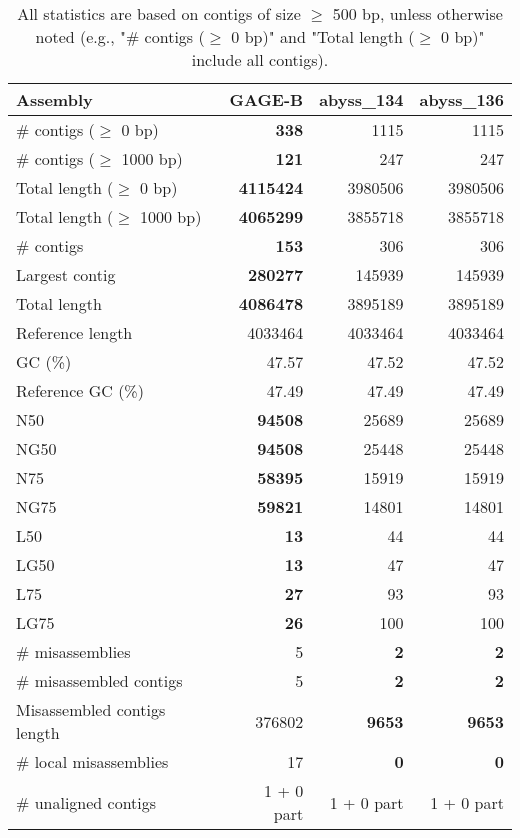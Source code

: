 \documentclass[12pt,a4paper]{article}
\begin{document}
\begin{table}[ht]
\begin{center}
\caption{All statistics are based on contigs of size $\geq$ 500 bp, unless otherwise noted (e.g., "\# contigs ($\geq$ 0 bp)" and "Total length ($\geq$ 0 bp)" include all contigs).}
\begin{tabular}{|l*{3}{|r}|}
\hline
Assembly & GAGE-B & abyss\_134 & abyss\_136 \\ \hline
\# contigs ($\geq$ 0 bp) & {\bf 338} & 1115 & 1115 \\ \hline
\# contigs ($\geq$ 1000 bp) & {\bf 121} & 247 & 247 \\ \hline
Total length ($\geq$ 0 bp) & {\bf 4115424} & 3980506 & 3980506 \\ \hline
Total length ($\geq$ 1000 bp) & {\bf 4065299} & 3855718 & 3855718 \\ \hline
\# contigs & {\bf 153} & 306 & 306 \\ \hline
Largest contig & {\bf 280277} & 145939 & 145939 \\ \hline
Total length & {\bf 4086478} & 3895189 & 3895189 \\ \hline
Reference length & 4033464 & 4033464 & 4033464 \\ \hline
GC (\%) & 47.57 & 47.52 & 47.52 \\ \hline
Reference GC (\%) & 47.49 & 47.49 & 47.49 \\ \hline
N50 & {\bf 94508} & 25689 & 25689 \\ \hline
NG50 & {\bf 94508} & 25448 & 25448 \\ \hline
N75 & {\bf 58395} & 15919 & 15919 \\ \hline
NG75 & {\bf 59821} & 14801 & 14801 \\ \hline
L50 & {\bf 13} & 44 & 44 \\ \hline
LG50 & {\bf 13} & 47 & 47 \\ \hline
L75 & {\bf 27} & 93 & 93 \\ \hline
LG75 & {\bf 26} & 100 & 100 \\ \hline
\# misassemblies & 5 & {\bf 2} & {\bf 2} \\ \hline
\# misassembled contigs & 5 & {\bf 2} & {\bf 2} \\ \hline
Misassembled contigs length & 376802 & {\bf 9653} & {\bf 9653} \\ \hline
\# local misassemblies & 17 & {\bf 0} & {\bf 0} \\ \hline
\# unaligned contigs & 1 + 0 part & 1 + 0 part & 1 + 0 part \\ \hline

\end{tabular}
\end{center}
\end{table}
\end{document}
